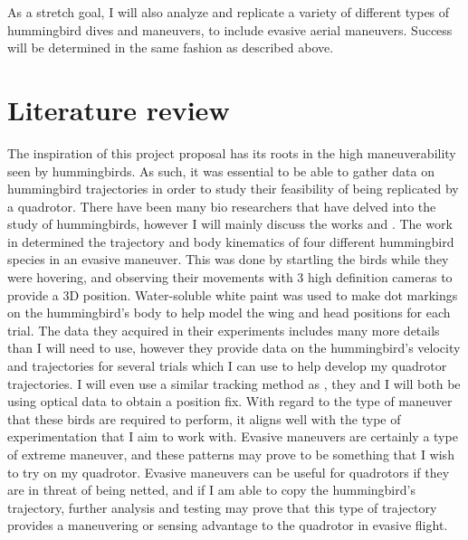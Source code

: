 \documentclass[onecolumn,10pt]{IEEEtran}
\begin{document}
As a stretch goal, I will also analyze and replicate a variety of different types of hummingbird dives and maneuvers, to include evasive aerial maneuvers. Success will be determined in the same fashion as described above.

\section{Literature review}
The inspiration of this project proposal has its roots in the high maneuverability seen by hummingbirds. As such, it was essential to be able to gather data on hummingbird trajectories in order to study their feasibility of being replicated by a quadrotor. There have been many bio researchers that have delved into the study of hummingbirds, however I will mainly discuss the works \cite{clark2009courtship} and \cite{cheng2016flight}. The work in \cite{cheng2016flight} determined the trajectory and body kinematics of four different hummingbird species in an evasive maneuver. This was done by startling the birds while they were hovering, and observing their movements with 3 high definition cameras to provide a 3D position. Water-soluble white paint was used to make dot markings on the hummingbird’s body to help model the wing and head positions for each trial. The data they acquired in their experiments includes many more details than I will need to use, however they provide data on the hummingbird’s velocity and trajectories for several trials which I can use to help develop my quadrotor trajectories. I will even use a similar tracking method as \cite{cheng2016flight}, they and I will both be using optical data to obtain a position fix. With regard to the type of maneuver that these birds are required to perform, it aligns well with the type of experimentation that I aim to work with. Evasive maneuvers are certainly a type of extreme maneuver, and these patterns may prove to be something that I wish to try on my quadrotor. Evasive maneuvers can be useful for quadrotors if they are in threat of being netted, and if I am able to copy the hummingbird’s trajectory, further analysis and testing may prove that this type of trajectory provides a maneuvering or sensing advantage to the quadrotor in evasive flight.
\end{document}
